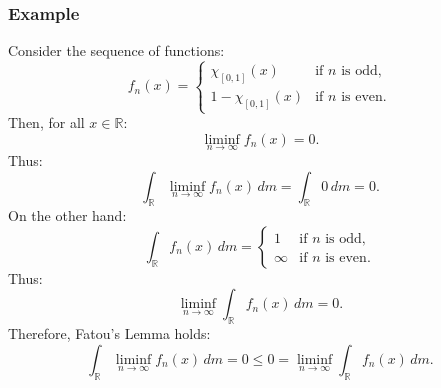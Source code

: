 \documentclass[11pt]{article}
\begin{document}
\subsubsection*{Example}
Consider the sequence of functions:
\[f_n(x) = \begin{cases}
    \chi_{[0, 1]} (x) & \text{if } n \text{ is odd}, \\
    1 - \chi_{[0, 1]} (x) & \text{if } n \text{ is even}.
\end{cases}\]
Then, for all \(x \in \mathbb{R}\):
\[\liminf_{n \to \infty} f_n(x) = 0.\]
Thus:
\[\int_{\mathbb{R}} \liminf_{n \to \infty} f_n(x) \,dm = \int_{\mathbb{R}} 0 \,dm = 0.\]
On the other hand:
\[\int_{\mathbb{R}} f_n(x) \,dm = \begin{cases}
    1 & \text{if } n \text{ is odd}, \\
    \infty & \text{if } n \text{ is even}.
\end{cases}\]
Thus:
\[\liminf_{n \to \infty} \int_{\mathbb{R}} f_n(x) \,dm = 0.\]
Therefore, Fatou's Lemma holds:
\[\int_{\mathbb{R}} \liminf_{n \to \infty} f_n(x) \,dm = 0 \leq 0 = \liminf_{n \to \infty} \int_{\mathbb{R}} f_n(x) \,dm.\] 
\end{document}
